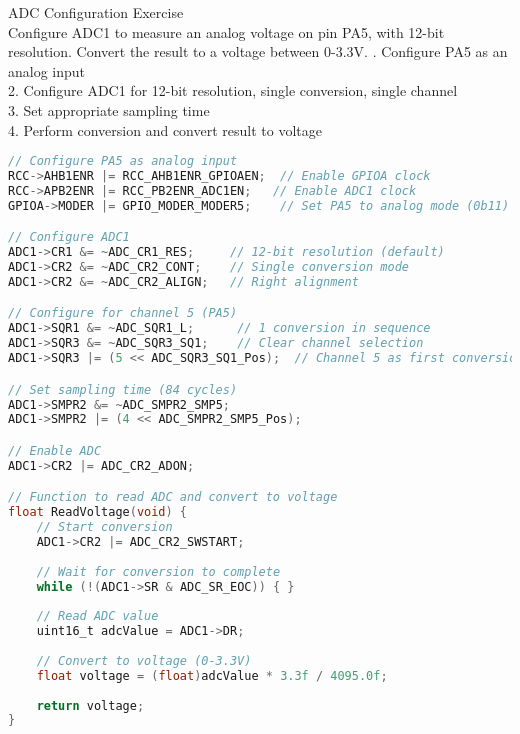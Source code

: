 \begin{example2}{ADC Configuration Exercise}\\
Configure ADC1 to measure an analog voltage on pin PA5, with 12-bit resolution. Convert the result to a voltage between 0-3.3V.
. Configure PA5 as an analog input\\
2. Configure ADC1 for 12-bit resolution, single conversion, single channel\\
3. Set appropriate sampling time\\
4. Perform conversion and convert result to voltage

\begin{lstlisting}[language=C, style=basesmol]
// Configure PA5 as analog input
RCC->AHB1ENR |= RCC_AHB1ENR_GPIOAEN;  // Enable GPIOA clock
RCC->APB2ENR |= RCC_PB2ENR_ADC1EN;   // Enable ADC1 clock
GPIOA->MODER |= GPIO_MODER_MODER5;    // Set PA5 to analog mode (0b11)

// Configure ADC1
ADC1->CR1 &= ~ADC_CR1_RES;     // 12-bit resolution (default)
ADC1->CR2 &= ~ADC_CR2_CONT;    // Single conversion mode
ADC1->CR2 &= ~ADC_CR2_ALIGN;   // Right alignment

// Configure for channel 5 (PA5)
ADC1->SQR1 &= ~ADC_SQR1_L;      // 1 conversion in sequence
ADC1->SQR3 &= ~ADC_SQR3_SQ1;    // Clear channel selection
ADC1->SQR3 |= (5 << ADC_SQR3_SQ1_Pos);  // Channel 5 as first conversion

// Set sampling time (84 cycles)
ADC1->SMPR2 &= ~ADC_SMPR2_SMP5;
ADC1->SMPR2 |= (4 << ADC_SMPR2_SMP5_Pos);

// Enable ADC
ADC1->CR2 |= ADC_CR2_ADON;

// Function to read ADC and convert to voltage
float ReadVoltage(void) {
    // Start conversion
    ADC1->CR2 |= ADC_CR2_SWSTART;
    
    // Wait for conversion to complete
    while (!(ADC1->SR & ADC_SR_EOC)) { }
    
    // Read ADC value
    uint16_t adcValue = ADC1->DR;
    
    // Convert to voltage (0-3.3V)
    float voltage = (float)adcValue * 3.3f / 4095.0f;
    
    return voltage;
}
\end{lstlisting}
\end{example2}



